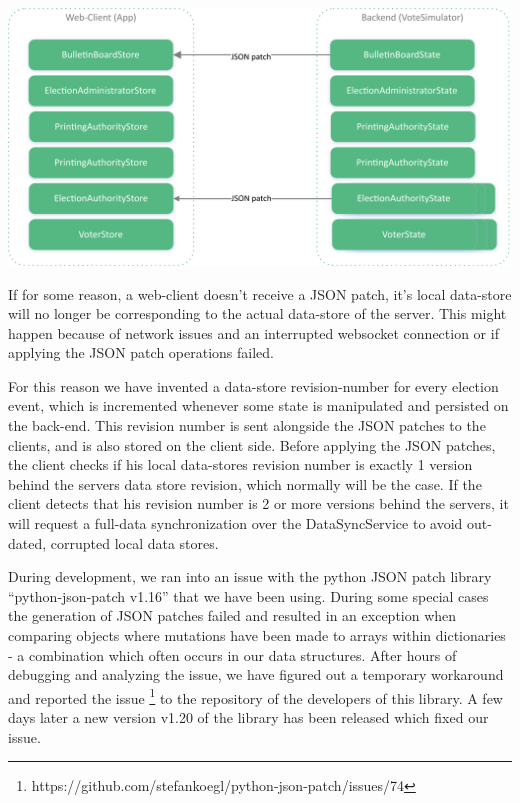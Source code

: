\begin{center}
\includegraphics[scale=0.62]{assets/DatastoresJsonPatch.pdf}
\label{Data-Sync with JSON Patches}%
\end{center}

If for some reason, a web-client doesn't receive a JSON patch, it's local data-store will no longer be corresponding to the actual data-store of the server. This might happen because of network issues and an interrupted websocket connection or if applying the JSON patch operations failed.

For this reason we have invented a data-store revision-number for every election event, which is incremented whenever some state is manipulated and persisted on the back-end. This revision number is sent alongside the JSON patches to the clients, and is also stored on the client side. Before applying the JSON patches, the client checks if his local data-stores revision number is exactly 1 version behind the servers data store revision, which normally will be the case. If the client detects that his revision number is 2 or more versions behind the servers, it will request a full-data synchronization over the DataSyncService to avoid out-dated, corrupted local data stores.

During development, we ran into an issue with the python JSON patch library "`python-json-patch v1.16"' that we have been using. During some special cases the generation of JSON patches failed and resulted in an exception when comparing objects where mutations have been made to arrays within dictionaries - a combination which often occurs in our data structures. After hours of debugging and analyzing the issue, we have figured out a temporary workaround and reported the issue \footnote{https://github.com/stefankoegl/python-json-patch/issues/74} to the repository of the developers of this library. A few days later a new version v1.20 of the library has been released which fixed our issue.

